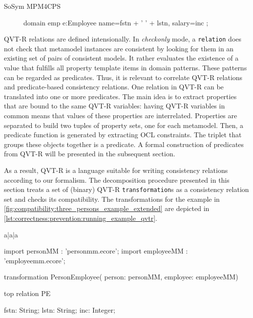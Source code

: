\begin{copiedFrom}{SoSym MPM4CPS}
\begin{figure}
\begin{embeddedqvtcode}[frame=bt, numbers=none, mathescape=true, caption={Two domains, each with one domain pattern},label={qvt:domainpatterns},captionpos=b]
domain emp e:Employee {
    name=fstn + ' ' + lstn,
    salary=inc
};
\end{embeddedqvtcode}
\end{figure}
QVT-R relations are defined intensionally. In \textit{checkonly} mode, a \texttt{relation} does not check that metamodel instances are consistent by looking for them in an existing set of pairs of consistent models. It rather evaluates the existence of a value that fulfills all property template items in domain patterns. These patterns can be regarded as predicates. Thus, it is relevant to correlate QVT-R relations and predicate-based consistency relations. One relation in QVT-R can be translated into one or more predicates. The main idea is to extract properties that are bound to the same QVT-R variables: having QVT-R variables in common means that values of these properties are interrelated. Properties are separated to build two tuples of property sets, one for each metamodel. Then, a predicate function is generated by extracting OCL constraints. The triplet that groups these objects together is a predicate. A formal construction of predicates from QVT-R
will be presented in the subsequent section.

As a result, QVT-R is a language suitable for writing consistency relations according to our formalism. The decomposition procedure presented in this section treats a set of (binary) QVT-R \texttt{transformation}s as a consistency relation set and checks its compatibility.
The \qvtr transformations for the example in \autoref{fig:compatibility:three_persons_example_extended} are depicted in \autoref{lst:correctness:prevention:running_example_qvtr}.

    
\begin{figure*}
    \centering
    \begin{tabular}{a|a|a}
        \begin{embeddedqvtcode}[basicstyle=\scriptsize\ttfamily, frame=none, numbers=none, mathescape=true, linewidth=0.30\textwidth, breaklines=true]
import personMM   : 'personmm.ecore';
import employeeMM : 'employeemm.ecore';

transformation PersonEmployee(
    person: personMM,
    employee: employeeMM) {
    
	top relation PE {
		fstn: String;
		lstn: String;
		inc: Integer;
		
}}
\end{embeddedqvtcode}
\end{tabular}
\end{figure*}
\end{copiedFrom}
